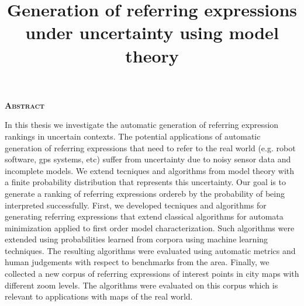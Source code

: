 \begin{center}

{ \vspace*{1cm} }
\huge{\textbf{\textsc{\textmd{Abstract}}}}\\[1cm]

\end{center}

\title{Generation of referring expressions under uncertainty using model theory}

\normalsize{In this thesis we investigate the automatic generation of referring expression rankings in uncertain contexts. The potential applications of automatic generation of referring expressions that need to refer to the real world (e.g. robot software, gps systems, etc) suffer from uncertainty due to noisy sensor data and incomplete models. We extend tecniques and algorithms from model theory with a finite probability distribution that represents this uncertainty. Our goal is to generate a ranking of referring expressions ordereb by the probability of being interpreted successfully. First, we developed tecniques and algorithms for generating referring expressions that extend classical algorithms for automata minimization applied to first order model characterization. Such algorithms were extended using probabilities learned from corpora using machine learning techniques. The resulting algorithms were evaluated using automatic metrics  and human judgements with respect to benchmarks from the area. Finally, we collected a new corpus of referring expressions of interest points in city maps with different zoom levels. The algorithms were evaluated on this corpus which is relevant to applications with maps of the real world.
}



